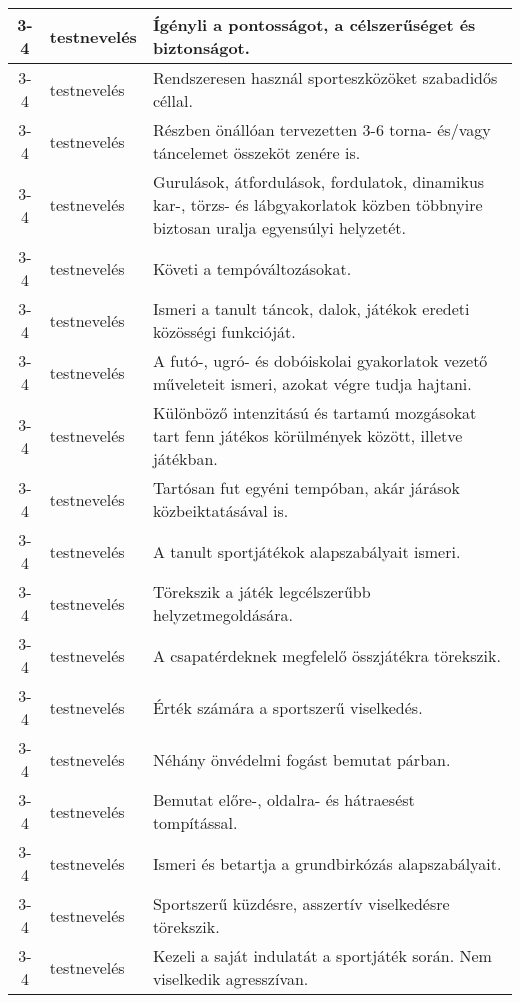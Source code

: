 \begin{small}
\begin{longtable}{c | p{2cm} |  p{11cm} }
              3-4 & testnevelés & Ígényli a pontosságot, a célszerűséget és biztonságot. \\ \hline
              3-4 & testnevelés & Rendszeresen használ sporteszközöket szabadidős céllal. \\ \hline
              3-4 & testnevelés & Részben önállóan tervezetten 3-6 torna- és/vagy táncelemet összeköt zenére is. \\ \hline
              3-4 & testnevelés & Gurulások, átfordulások, fordulatok, dinamikus kar-, törzs- és lábgyakorlatok közben többnyire biztosan uralja egyensúlyi helyzetét. \\ \hline
              3-4 & testnevelés & Követi a tempóváltozásokat. \\ \hline
              3-4 & testnevelés & Ismeri a tanult táncok, dalok, játékok eredeti közösségi funkcióját. \\ \hline
              3-4 & testnevelés & A futó-, ugró- és dobóiskolai gyakorlatok vezető műveleteit ismeri, azokat végre tudja hajtani. \\ \hline
              3-4 & testnevelés & Különböző intenzitású és tartamú mozgásokat tart fenn játékos körülmények között, illetve játékban. \\ \hline
              3-4 & testnevelés & Tartósan fut egyéni tempóban, akár járások közbeiktatásával is. \\ \hline
              3-4 & testnevelés & A tanult sportjátékok alapszabályait ismeri. \\ \hline
              3-4 & testnevelés & Törekszik a játék legcélszerűbb helyzetmegoldására. \\ \hline
              3-4 & testnevelés & A csapatérdeknek megfelelő összjátékra törekszik. \\ \hline
              3-4 & testnevelés & Érték számára a sportszerű viselkedés. \\ \hline
              3-4 & testnevelés & Néhány önvédelmi fogást bemutat párban. \\ \hline
              3-4 & testnevelés & Bemutat előre-, oldalra- és hátraesést tompítással. \\ \hline
              3-4 & testnevelés & Ismeri és betartja a grundbirkózás alapszabályait. \\ \hline
              3-4 & testnevelés & Sportszerű küzdésre, asszertív viselkedésre törekszik. \\ \hline
              3-4 & testnevelés & Kezeli a saját indulatát a sportjáték során. Nem viselkedik agresszívan. \\ \hline

\end{longtable}
\end{small}
